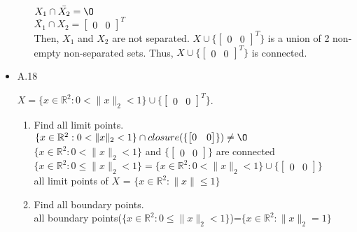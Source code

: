 \documentclass[12pt,letter]{article}
\newcommand{\R}{\mathbb{R}}
\begin{document}
\begin{itemize}
\begin{enumerate}
  $X_1 \cap \bar{X_2} = \O$\\
  $\bar{X_1} \cap X_2 = \begin{bmatrix}0 & 0\end{bmatrix}^T$\\

  Then, $X_1$ and $X_2$ are not separated. $X\cup\{\begin{bmatrix}0 & 0\end{bmatrix}^T\}$ is a union of 2 non-empty non-separated sets. Thus, $X\cup\{\begin{bmatrix}0 & 0\end{bmatrix}^T\}$ is connected.

\end{enumerate}

\pagebreak

\item A.18

  $X=\{x\in\R^2: 0<\|x\|_2<1\}\cup\{\begin{bmatrix}0 & 0 \end{bmatrix}^T\}$.

  \begin{enumerate}
  \item Find all limit points.\\
    $\{x\in\R^2: 0<\|x\|_2<1\} \cap closure(\{\begin{bmatrix}0 & 0 \end{bmatrix}\}) \neq \O$\\
    $\{x\in\R^2: 0<\|x\|_2<1\}$ and $\{\begin{bmatrix}0 & 0 \end{bmatrix}\}$ are connected\\
    $\{x\in\R^2: 0\leq\|x\|_2<1\}=\{x\in\R^2: 0<\|x\|_2<1\}\cup\{\begin{bmatrix}0 & 0 \end{bmatrix}\}$\\
    all limit points of $X$ = $\{x\in\R^2:\|x\|\leq 1\}$
  \item Find all boundary points.\\
    all boundary points($\{x\in\R^2: 0\leq\|x\|_2<1\}$)=$\{x\in\R^2: \|x\|_2=1\}$
  \end{enumerate}


\end{itemize}
\end{document}
